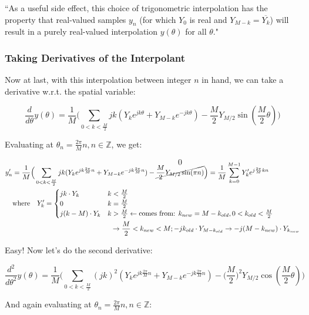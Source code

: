 \documentclass[10pt]{article}
\begin{document}
``As a useful side effect, this choice of trigonometric interpolation has the property that real-valued samples $y_n$ (for which $Y_0$ is real and $Y_{M-k} = \overline{Y_k}$) will result in a purely real-valued interpolation $y(\theta)$ for all $\theta$."

\subsubsection{Taking Derivatives of the Interpolant}

Now at last, with this interpolation between integer $n$ in hand, we can take a derivative w.r.t. the spatial variable:

$$\frac{d}{d\theta} y(\theta) = \frac{1}{M} \Big( \sum_{0 < k < \frac{M}{2}} j k (Y_k e^{j k \theta} + Y_{M-k} e^{-j k \theta}) - \frac{M}{2} Y_{M/2} \sin(\frac{M}{2}\theta) \Big)$$

Evaluating at $\theta_n = \frac{2\pi}{M}n, n \in \mathbb{Z}$, we get:

\begin{align*}
y'_n &= \frac{1}{M} \Big( \sum_{0 < k < \frac{M}{2}} j k (Y_k e^{j k \frac{2\pi}{M}n} + Y_{M-k} e^{-j k \frac{2\pi}{M}n}) - \overset{\text{\large 0}}{\cancel{\frac{M}{2} Y_{M/2} \sin(\pi n)}} \Big) = \frac{1}{M} \sum_{k = 0}^{M-1} Y'_k e^{j\frac{2\pi}{M}kn} \\
& \text{where} \quad Y'_k = \begin{cases} j k \cdot Y_k & k < \frac{M}{2} \\ 0 & k = \frac{M}{2} \\ j(k - M) \cdot Y_k & k > \frac{M}{2} \leftarrow \text{comes from: } k_{new} = M - k_{old}, 0 < k_{old} < \frac{M}{2} \end{cases}\\ & \hspace{5cm} \rightarrow \frac{M}{2} < k_{new} < M; -jk_{old} \cdot Y_{M - k_{old}} \rightarrow -j(M - k_{new}) \cdot Y_{k_{new}}
\end{align*}

Easy! Now let's do the second derivative:

$$\frac{d^2}{d\theta^2} y(\theta) = \frac{1}{M} \Big( \sum_{0 < k < \frac{M}{2}} (jk)^2 (Y_k e^{j k \frac{2\pi}{M}n} + Y_{M-k} e^{-j k \frac{2\pi}{M}n}) - \Big(\frac{M}{2}\Big)^2 Y_{M/2} \cos(\frac{M}{2}\theta) \Big)$$

And again evaluating at $\theta_n = \frac{2\pi}{M}n, n \in \mathbb{Z}$:
\end{document}
